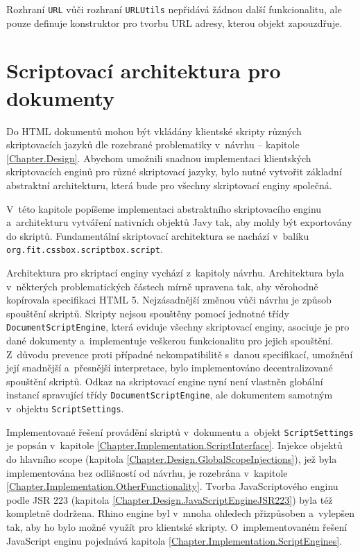 Rozhraní \texttt{URL} vůči rozhraní \texttt{URLUtils} nepřidává žádnou další funkcionalitu, ale pouze definuje konstruktor pro tvorbu URL adresy, kterou objekt zapouzdřuje.

\section{Scriptovací architektura pro dokumenty}
\label{Chapter.Implementation.ScriptingArchitecture}

Do HTML dokumentů mohou být vkládány klientské skripty různých skriptovacích jazyků dle rozebrané problematiky v~návrhu -- kapitole \ref{Chapter.Design}. Abychom umožnili snadnou implementaci klientských skriptovacích enginů pro různé skriptovací jazyky, bylo nutné vytvořit základní abstraktní architekturu, která bude pro všechny skriptovací enginy společná. 

V~této kapitole popíšeme implementaci abstraktního skriptovacího enginu a~architekturu vytváření nativních objektů Javy tak, aby mohly být exportovány do skriptů. Fundamentální skriptovací architektura se nachází v~balíku \texttt{org.fit.cssbox.scriptbox.script}. 

Architektura pro skriptací enginy vychází z~kapitoly návrhu. Architektura byla v~některých problematických částech mírně upravena tak, aby věrohodně kopírovala specifikaci HTML 5. Nejzásadnější změnou vůči návrhu je způsob spouštění skriptů. Skripty nejsou spouštěny pomocí jednotné třídy \texttt{DocumentScriptEngine}, která eviduje všechny skriptovací enginy, asociuje je pro dané dokumenty a~implementuje veškerou funkcionalitu pro jejich spouštění. Z~důvodu prevence proti případné nekompatibilitě s~danou specifikací, umožnění její snadnější a~přesnější interpretace, bylo implementováno decentralizované spouštění skriptů. Odkaz na skriptovací engine nyní není vlastněn globální instancí spravující třídy \texttt{DocumentScriptEngine}, ale dokumentem samotným v~objektu \texttt{ScriptSettings}.

Implementované řešení provádění skriptů v~dokumentu a~objekt \texttt{ScriptSettings} je popsán v~kapitole \ref{Chapter.Implementation.ScriptInterface}. Injekce objektů do hlavního scope (kapitola \ref{Chapter.Design.GlobalScopeInjections}), jež byla implementována bez odlišností od návrhu, je rozebrána v~kapitole \ref{Chapter.Implementation.OtherFunctionality}. Tvorba JavaScriptového enginu podle JSR 223 (kapitola \ref{Chapter.Design.JavaScriptEngineJSR223}) byla též kompletně dodržena. Rhino engine byl v~mnoha ohledech přizpůsoben a~vylepšen tak, aby ho bylo možné využít pro klientské skripty. O~implementovaném řešení JavaScript enginu pojednává kapitola \ref{Chapter.Implementation.ScriptEngines}.

